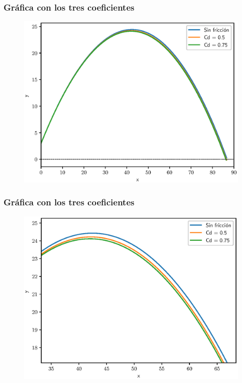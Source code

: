 \documentclass[12pt]{beamer}
\begin{document}
\begin{frame}
\frametitle{Gráfica con los tres coeficientes}
\begin{figure}
    \centering
    \includegraphics[scale=0.55]{Imagenes/Metodo_Predictor_Corrector_Martillo.eps}
\end{figure}
\end{frame}
\begin{frame}
\frametitle{Gráfica con los tres coeficientes}
\begin{figure}
    \centering
    \includegraphics[scale=0.55]{Imagenes/Metodo_Predictor_Corrector_Martillo_02.eps}
\end{figure}
\end{frame}
\end{document}
